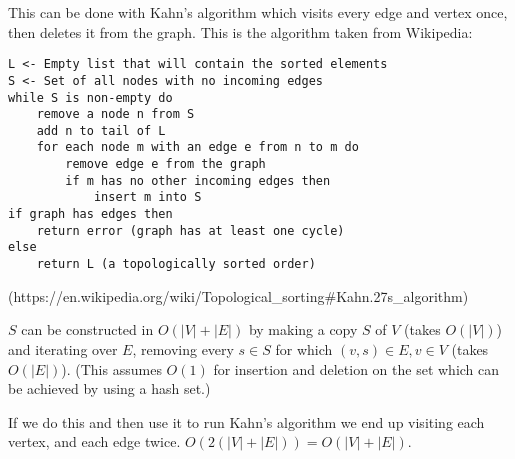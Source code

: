 \documentclass[12pt]{article}
\begin{document}
This can be done with Kahn's algorithm which visits every edge and vertex once, then deletes it from the graph. This is the algorithm taken from Wikipedia:

\begin{lstlisting}
L <- Empty list that will contain the sorted elements
S <- Set of all nodes with no incoming edges
while S is non-empty do
    remove a node n from S
    add n to tail of L
    for each node m with an edge e from n to m do
        remove edge e from the graph
        if m has no other incoming edges then
            insert m into S
if graph has edges then
    return error (graph has at least one cycle)
else
    return L (a topologically sorted order)
\end{lstlisting}
(https://en.wikipedia.org/wiki/Topological\_sorting\#Kahn.27s\_algorithm)

$S$ can be constructed in $O(|V| + |E|)$ by making a copy $S$ of $V$ (takes $O(|V|)$) and iterating over $E$, removing every $s \in S$ for which $(v, s) \in E, v\in V$ (takes $O(|E|)$). (This assumes $O(1)$ for insertion and deletion on the set which can be achieved by using a hash set.)

If we do this and then use it to run Kahn's algorithm we end up visiting each vertex, and each edge twice. $O(2(|V| + |E|)) = O(|V| + |E|)$.
\end{document}
